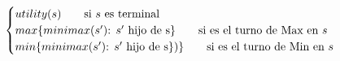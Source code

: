 \documentclass[preview]{standalone}
\begin{document}
\begin{align*}
\begin{cases}
                                 utility(s) \qquad \text{si $s$ es terminal} \cr
                                 max\{minimax(\text{$s'$): $s'$ hijo de }$s$\}\qquad \text{si es el turno de Max en $s$} \cr
                                 min\{minimax(\text{$s'$): $s'$ hijo de }$s$\})\}\qquad \text{si es el turno de Min en $s$} \cr
                                 \end{cases}
\end{align*}
\end{document}
